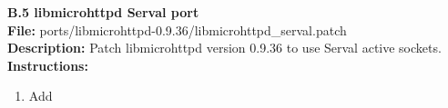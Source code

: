 \newpage
{}
{}
{\huge \bf \noindent B.5 libmicrohttpd Serval port}\\[0.5cm]
\textbf{File:} ports/libmicrohttpd-0.9.36/libmicrohttpd\_serval.patch\\
\textbf{Description:} Patch libmicrohttpd version 0.9.36 to use Serval active sockets.\\
\textbf{Instructions: }
\begin{enumerate} \itemsep1pt \parskip0pt 
	\item Add\\[0.5cm]
\end{enumerate}

